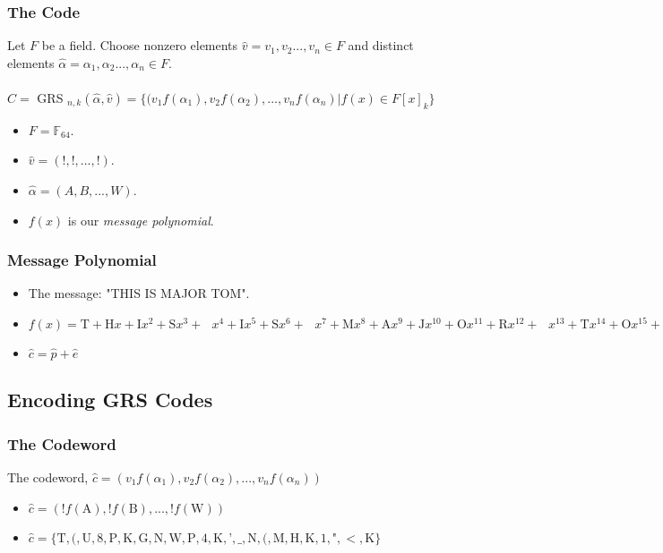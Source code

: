 \documentclass{beamer}
\begin{document}
\begin{frame}
	\frametitle{The Code}
	Let $F$ be a field. Choose nonzero elements $\hat{v} = v_{1}, v_{2}...,v_{n} \in F$ and distinct elements $\hat{\alpha} = \alpha_{1}, \alpha_{2}...,\alpha_{n} \in F$.\\~\\
	
	$C = $ GRS $_{n, k}(\hat{\alpha}, \hat{v}) = \{(v_{1}f(\alpha_{1}),v_{2}f(\alpha_{2}),...,v_{n}f(\alpha_{n}) | f(x) \in F[x]_{k}\}$
	\begin{itemize}
		\item $F = \mathbb{F}_{64}$.
		\item $\hat{v} = (!, !, ..., !)$.
		\item $\hat{\alpha} = (A, B, ..., W)$.
		\item $f(x)$ is our \textit{message polynomial}.
	\end{itemize}
\end{frame}

\begin{frame}
	\frametitle{Message Polynomial}
	\begin{itemize}
		\item The message: "THIS IS MAJOR TOM".
		\item $f(x) = \text{T} + \text{H}x + \text{I}x^{2} + \text{S}x^{3} + \text{ }x^{4} + \text{I}x^{5} + \text{S}x^{6} + \text{ }x^{7} + \text{M}x^{8} + \text{A}x^{9} + \text{J}x^{10} + \text{O}x^{11} + \text{R}x^{12} + \text{ }x^{13} + \text{T}x^{14} + \text{O}x^{15} + \text{M}x^{16}$
		\item $\hat{c} = \hat{p} + \hat{e}$
	\end{itemize}
\end{frame}

\subsection{Encoding GRS Codes}

\begin{frame}
	\frametitle{The Codeword}
	The codeword, $\hat{c} = (v_{1}f(\alpha_{1}),v_{2}f(\alpha_{2}),...,v_{n}f(\alpha_{n}))$
	\begin{itemize}
		\item $\hat{c} = (!f(\text{A}),!f(\text{B}),...,!f(\text{W}))$
		\item $\hat{c} = \{\text{T}, \text{(}, \text{U}, \text{8}, \text{P}, \text{K}, \text{G}, \text{N}, \text{W}, \text{P}, \text{4}, \text{K}, \text{'}, \text{\_}, \text{N}, \text{(}, \text{M}, \text{H}, \text{K}, \text{1}, \text{"}, <, \text{K}\}$
	\end{itemize}
	
\end{frame}
\end{document}
